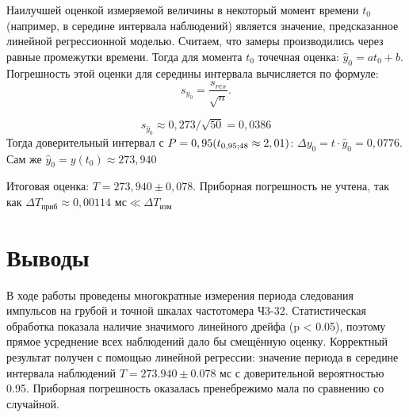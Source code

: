 Наилучшей оценкой измеряемой величины в некоторый момент времени $t_0$ (например, в середине интервала наблюдений) является значение, предсказанное линейной регрессионной моделью. Считаем, что замеры производились через равные промежутки времени. Тогда для момента $t_0$ точечная оценка: $\hat{y}_0= at_0 + b$.
Погрешность этой оценки для середины интервала вычисляется по формуле:
\begin{equation}
    s_{\hat{y}_0} = \frac{s_{res}}{\sqrt{n}}.
\end{equation}

$$s_{\hat{y}_0} \approx 0,273/\sqrt{50} = 0,0386$$ 
Тогда доверительный интервал с $P = 0,95 \space (t_{0,95;48} \approx 2,01)$: $\Delta y_0 = t \cdot \hat{y}_0 = 0,0776$. Сам же $\hat{y}_0 = y(t_0) \approx 273,940$

Итоговая оценка: $T = 273,940 \pm 0,078$. Приборная погрешность не учтена, так как $\Delta T_{\textit{приб}} \approx 0,00114 \textit{ мс} \ll \Delta T_{\textit{изм}}$

\section{Выводы}
В ходе работы проведены многократные измерения периода следования импульсов на грубой и точной шкалах частотомера Ч3-32. Статистическая обработка показала наличие значимого линейного дрейфа (p < 0.05), поэтому прямое усреднение всех наблюдений дало бы смещённую оценку. Корректный результат получен с помощью линейной регрессии: значение периода в середине интервала наблюдений $T=273.940 \pm 0.078 \textit{ мс}$ с доверительной вероятностью 0.95. Приборная погрешность оказалась пренебрежимо мала по сравнению со случайной.

